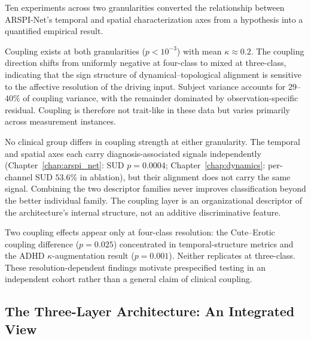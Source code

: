 Ten experiments across two granularities converted the relationship between ARSPI-Net's temporal and spatial characterization axes from a hypothesis into a quantified empirical result.

Coupling exists at both granularities ($p < 10^{-3}$) with mean $\kappa \approx 0.2$. The coupling direction shifts from uniformly negative at four-class to mixed at three-class, indicating that the sign structure of dynamical--topological alignment is sensitive to the affective resolution of the driving input. Subject variance accounts for $29$--$40\%$ of coupling variance, with the remainder dominated by observation-specific residual. Coupling is therefore not trait-like in these data but varies primarily across measurement instances.

No clinical group differs in coupling strength at either granularity. The temporal and spatial axes each carry diagnosis-associated signals independently (Chapter~\ref{chap:arspi_net}: SUD $p = 0.0004$; Chapter~\ref{chap:dynamics}: per-channel SUD $53.6\%$ in ablation), but their alignment does not carry the same signal. Combining the two descriptor families never improves classification beyond the better individual family. The coupling layer is an organizational descriptor of the architecture's internal structure, not an additive discriminative feature.

Two coupling effects appear only at four-class resolution: the Cute--Erotic coupling difference ($p = 0.025$) concentrated in temporal-structure metrics and the ADHD $\kappa$-augmentation result ($p = 0.001$). Neither replicates at three-class. These resolution-dependent findings motivate prespecified testing in an independent cohort rather than a general claim of clinical coupling.

\subsection{The Three-Layer Architecture: An Integrated View}

